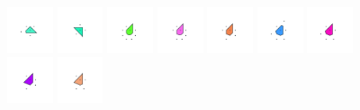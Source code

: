 \documentclass[text.tex]{subfiles}
\begin{document}
\begin{figure}[h!]
\includegraphics[width=0.12\textwidth]{img/results/octagon/octagon_229289_(7_-1alpha_2)_005.pdf}
\includegraphics[width=0.12\textwidth]{img/results/octagon/octagon_229289_(7_-1alpha_2)_006.pdf}
\includegraphics[width=0.12\textwidth]{img/results/octagon/octagon_229289_(7_-1alpha_2)_007.pdf}
\includegraphics[width=0.12\textwidth]{img/results/octagon/octagon_229289_(7_-1alpha_2)_008.pdf}
\includegraphics[width=0.12\textwidth]{img/results/octagon/octagon_229289_(7_-1alpha_2)_009.pdf}
\includegraphics[width=0.12\textwidth]{img/results/octagon/octagon_229289_(7_-1alpha_2)_010.pdf}
\includegraphics[width=0.12\textwidth]{img/results/octagon/octagon_229289_(7_-1alpha_2)_011.pdf}
\includegraphics[width=0.12\textwidth]{img/results/octagon/octagon_229289_(7_-1alpha_2)_012.pdf}
\includegraphics[width=0.12\textwidth]{img/results/octagon/octagon_229289_(7_-1alpha_2)_013.pdf}

\end{figure}
\end{document}
